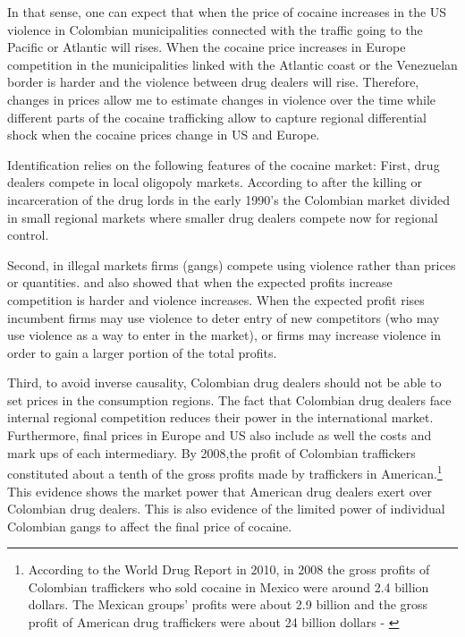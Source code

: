 \documentclass[a4paper,10pt,twocolumn,preprint,3p,authoryear]{elsarticle}
\begin{document}
In that sense, one can expect that when the price of cocaine increases in the US violence in Colombian municipalities connected with the traffic going to the Pacific or Atlantic will rises. When the cocaine price increases in Europe competition in the municipalities linked with the Atlantic coast or the Venezuelan border is harder and the violence between drug dealers will rise. Therefore, changes in prices allow me to estimate changes in violence over the time while different parts of the cocaine trafficking allow to capture regional differential shock when the cocaine prices change in US and Europe.

Identification relies on the following features of the cocaine market: First, drug dealers compete in local oligopoly markets.  According to \citet{Echandia2013} after the killing or incarceration of the drug lords in the early 1990's the Colombian market divided in small regional markets where smaller drug dealers compete now for regional control.

Second, in illegal markets firms (gangs) compete using violence rather than prices or quantities. \citet{Kugler2005} and \citet{Fiorentini1995} also showed that when the expected profits increase competition is harder and violence increases. When the expected profit rises incumbent firms may use violence to deter entry of new competitors (who may use violence as a way to enter in the market), or firms may increase violence in order to gain a larger portion of the total profits.

Third, to avoid inverse causality, Colombian drug dealers should not be able to set prices in the consumption regions. The fact that Colombian drug dealers face internal regional competition reduces their power in the international market. Furthermore, final prices in Europe and US also include as well the costs and mark ups of each intermediary. By 2008,the profit of  Colombian traffickers constituted about a tenth of the gross profits made by traffickers in American.\footnote{According to the World Drug Report in 2010, in 2008 the gross profits of Colombian traffickers who sold cocaine in Mexico were around 2.4 billion dollars. The Mexican groups' profits were about 2.9 billion and the gross profit of American drug traffickers were about 24 billion dollars - \citet{UNODC20002012}} This evidence shows the market power that American drug dealers exert over Colombian drug dealers. This is also evidence of the limited power of individual Colombian gangs to affect the final price of cocaine.
\end{document}
